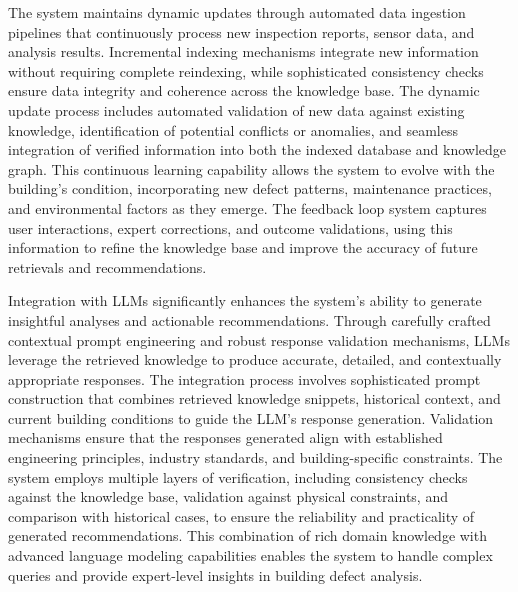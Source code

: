 \documentclass[a4paper,fleqn]{cas-sc}
\begin{document}
The system maintains dynamic updates through automated data ingestion pipelines that continuously process new inspection reports, sensor data, and analysis results. Incremental indexing mechanisms integrate new information without requiring complete reindexing, while sophisticated consistency checks ensure data integrity and coherence across the knowledge base. The dynamic update process includes automated validation of new data against existing knowledge, identification of potential conflicts or anomalies, and seamless integration of verified information into both the indexed database and knowledge graph. This continuous learning capability allows the system to evolve with the building's condition, incorporating new defect patterns, maintenance practices, and environmental factors as they emerge. The feedback loop system captures user interactions, expert corrections, and outcome validations, using this information to refine the knowledge base and improve the accuracy of future retrievals and recommendations.

Integration with LLMs significantly enhances the system's ability to generate insightful analyses and actionable recommendations. Through carefully crafted contextual prompt engineering and robust response validation mechanisms, LLMs leverage the retrieved knowledge to produce accurate, detailed, and contextually appropriate responses. The integration process involves sophisticated prompt construction that combines retrieved knowledge snippets, historical context, and current building conditions to guide the LLM's response generation. Validation mechanisms ensure that the responses generated align with established engineering principles, industry standards, and building-specific constraints. The system employs multiple layers of verification, including consistency checks against the knowledge base, validation against physical constraints, and comparison with historical cases, to ensure the reliability and practicality of generated recommendations. This combination of rich domain knowledge with advanced language modeling capabilities enables the system to handle complex queries and provide expert-level insights in building defect analysis.
\end{document}
